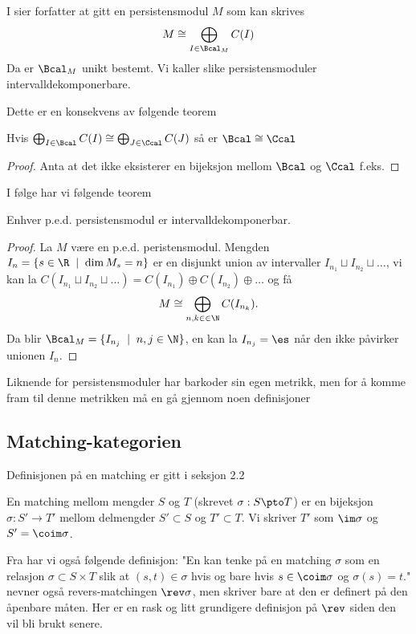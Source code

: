 I \cite{Bauer2015a} sier forfatter at gitt en persistensmodul $M$ som kan skrives
\[M\cong\bigoplus_{I\in\Bcal_M}C(I)\]
Da er $\Bcal_M$ unikt bestemt. Vi kaller slike persistensmoduler intervalldekomponerbare.

Dette er en konsekvens av følgende teorem

\begin{theorem}\label{Thrm:label}
    Hvis $\bigoplus_{I\in\Bcal}C(I)\cong\bigoplus_{J\in\Ccal} C(J)$ så er $\Bcal\cong\Ccal$
\end{theorem}
\begin{proof}
Anta at det ikke eksisterer en bijeksjon mellom $\Bcal$ og $\Ccal$ f.eks. 
\end{proof}

I følge \cite{Bauer2015a} har vi følgende teorem
\begin{theorem}\label{Thrm:thrm2.1}
	Enhver p.e.d. persistensmodul er intervalldekomponerbar.
\end{theorem}
\begin{proof}
	La $M$ være en p.e.d. peristensmodul. Mengden $I_n = \{s\in\R\;\mid\;\dim M_s=n\}$ er en disjunkt union av intervaller $I_{n_1}\sqcup I_{n_2}\sqcup\dots$, vi kan la $C(I_{n_1}\sqcup I_{n_2}\sqcup\dots)=C(I_{n_1})\oplus C(I_{n_2})\oplus\dots$ og få
	\[M\cong \bigoplus_{n,k\in\in\N} C(I_{n_k}).\]
	Da blir $\Bcal_M = \{I_{n_j}\;\mid\; n,j\in\N\}$, en kan la $I_{n_j}=\es$ når den ikke påvirker unionen $I_n$. 
\end{proof}

Liknende for persistensmoduler har barkoder sin egen metrikk, men for å komme fram til denne metrikken må en gå gjennom noen definisjoner

\subsection{Matching-kategorien}
Definisjonen på en matching er gitt i \cite{Bauer2015a} seksjon 2.2
\begin{definition}\label{Def:Matching}
	En matching mellom mengder $S$ og $T$ (skrevet $\sigma:S\pto T$) er en bijeksjon $\sigma: S'\to T'$ mellom delmengder $S'\subset S$ og $T'\subset T$. Vi skriver $T'$ som $\im\sigma$ og $S' = \coim\sigma$.
\end{definition}
Fra \cite{Bauer2015a} har vi også følgende definisjon: "En kan tenke på en matching $\sigma$ som en relasjon $\sigma\subset S\times T$ slik at $(s,t)\in \sigma$ hvis og bare hvis $s\in\coim\sigma$ og $\sigma(s)=t$."
\cite{Bauer2015a} nevner også revers-matchingen $\rev\sigma$, men skriver bare at den er definert på den åpenbare måten. Her er en rask og litt grundigere definisjon på $\rev$ siden den vil bli brukt senere.

